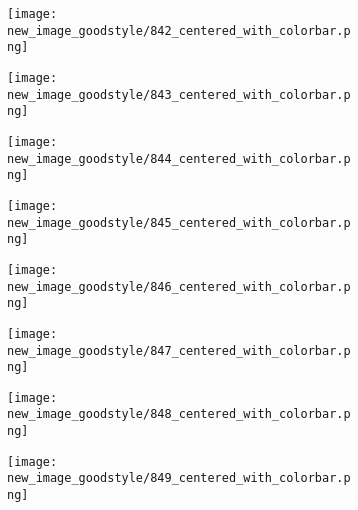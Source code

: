 \documentclass[a4paper,12pt]{article}
\begin{document}
\begin{figure}[H]
  \begin{subfigure}{0.11\textwidth}
    \texttt{[image: new\_image\_goodstyle/842\_centered\_with\_colorbar.png]}
  \end{subfigure}
  \hfill
  \begin{subfigure}{0.11\textwidth}
    \texttt{[image: new\_image\_goodstyle/843\_centered\_with\_colorbar.png]}
  \end{subfigure}
  \hfill
  \begin{subfigure}{0.11\textwidth}
    \texttt{[image: new\_image\_goodstyle/844\_centered\_with\_colorbar.png]}
  \end{subfigure}
  \hfill
  \begin{subfigure}{0.11\textwidth}
    \texttt{[image: new\_image\_goodstyle/845\_centered\_with\_colorbar.png]}
  \end{subfigure}
  \hfill
  \begin{subfigure}{0.11\textwidth}
    \texttt{[image: new\_image\_goodstyle/846\_centered\_with\_colorbar.png]}
  \end{subfigure}
  \hfill
  \begin{subfigure}{0.11\textwidth}
    \texttt{[image: new\_image\_goodstyle/847\_centered\_with\_colorbar.png]}
  \end{subfigure}
  \hfill
  \begin{subfigure}{0.11\textwidth}
    \texttt{[image: new\_image\_goodstyle/848\_centered\_with\_colorbar.png]}
  \end{subfigure}
  \hfill
  \begin{subfigure}{0.11\textwidth}
    \texttt{[image: new\_image\_goodstyle/849\_centered\_with\_colorbar.png]}
  \end{subfigure}
  \hfill
\end{figure}
\end{document}
